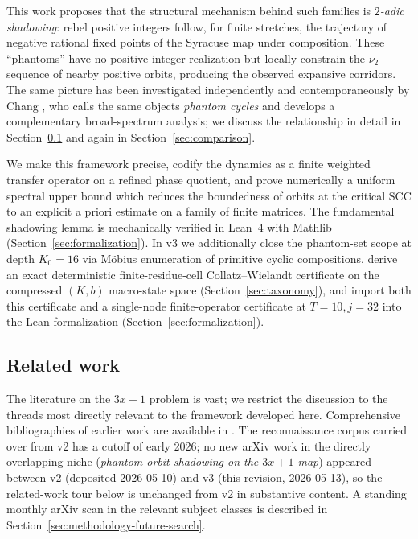 \documentclass[11pt,a4paper]{article}
\theoremstyle{definition}
\begin{document}
This work proposes that the structural mechanism behind such families
is \emph{$2$-adic shadowing}: rebel positive integers follow, for
finite stretches, the trajectory of negative rational fixed points
of the Syracuse map under composition. These ``phantoms'' have no
positive integer realization but locally constrain the $\nu_2$
sequence of nearby positive orbits, producing the observed expansive
corridors. The same picture has been investigated independently and
contemporaneously by Chang \cite{chang2026}, who calls the same
objects \emph{phantom cycles} and develops a complementary
broad-spectrum analysis; we discuss the relationship in detail in
Section~\ref{sec:related} and again in
Section~\ref{sec:comparison}.

We make this framework precise, codify the dynamics as a finite
weighted transfer operator on a refined phase quotient, and prove
numerically a uniform spectral upper bound which reduces the
boundedness of orbits at the critical SCC to an explicit a priori
estimate on a family of finite matrices. The fundamental shadowing
lemma is mechanically verified in Lean~4 with Mathlib
(Section~\ref{sec:formalization}). In v3 we additionally close the
phantom-set scope at depth $K_0 = 16$ via M\"obius enumeration of
primitive cyclic compositions, derive an exact deterministic
finite-residue-cell Collatz--Wielandt certificate on the compressed
$(K, b)$ macro-state space (Section~\ref{sec:taxonomy}), and import
both this certificate and a single-node finite-operator certificate
at $T = 10, j = 32$ into the Lean formalization
(Section~\ref{sec:formalization}).

\subsection{Related work}
\label{sec:related}

The literature on the $3x+1$ problem is vast; we restrict the
discussion to the threads most directly relevant to the framework
developed here. Comprehensive bibliographies of earlier work are
available in \cite{lagarias2010,laga2003bib,laga2009bib}.
The reconnaissance corpus carried over from v2 has a cutoff of early
2026; no new arXiv work in the directly overlapping niche
(\emph{phantom orbit shadowing on the $3x+1$ map}) appeared between
v2 (deposited 2026-05-10) and v3 (this revision, 2026-05-13), so the
related-work tour below is unchanged from v2 in substantive content.
A standing monthly arXiv scan in the relevant subject classes is
described in Section~\ref{sec:methodology-future-search}.
\end{document}
